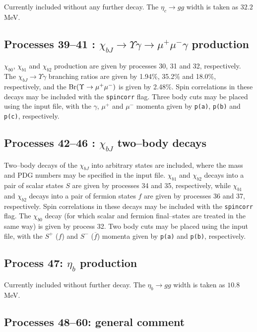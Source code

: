 \documentclass[12pt]{article}
\begin{document}
Currently included without any further decay. The $\eta_c \to gg$ width is taken as $32.2$ MeV.

\subsection{Processes 39--41 : $\chi_{bJ}\to \Upsilon\gamma\to \mu^+\mu^-\gamma$ production}

$\chi_{b0}$, $\chi_{b1}$ and $\chi_{b2}$ production are given by processes 30, 31 and 32, respectively. The $\chi_{bJ}\to \Upsilon \gamma$ branching 
ratios are given by 1.94\%, 35.2\% and 18.0\%, respectively, and the ${\rm Br}(\Upsilon\to\mu^+\mu^-)$ is given by 2.48\%. Spin correlations in these 
decays may be included with the \texttt{spincorr} flag. Three body cuts may be placed using the input file, with the $\gamma$, $\mu^+$ and $\mu^-$ 
momenta given by \texttt{p(a)}, \texttt{p(b)} and \texttt{p(c)}, respectively.

\subsection{Processes 42--46 : $\chi_{bJ}$ two--body decays}

Two--body decays of the $\chi_{bJ}$ into arbitrary states are included, where the mass and PDG numbers may be specified in the input file. $\chi_{b1}$ 
and $\chi_{b2}$ decays into a pair of scalar states $S$ are given by processes 34 and 35, respectively, while $\chi_{b1}$ and $\chi_{b2}$ decays into 
a pair of fermion states $f$ are given by processes 36 and 37, respectively. Spin correlations in these decays may be included with the \texttt{spincorr}
 flag.  The $\chi_{b0}$ decay (for which scalar and fermion final--states are treated in the same way) is given by process 32. Two body cuts may be placed
  using the input file, with the $S^+$ ($f$) and $S^-$ ($\overline{f}$) momenta given by \texttt{p(a)} and \texttt{p(b)}, respectively.

\subsection{Process 47: $\eta_b$ production}

Currently included without further decay. The $\eta_b \to gg$ width is taken as $10.8$ MeV.

\subsection{Processes 48--60: general comment}
\end{document}
